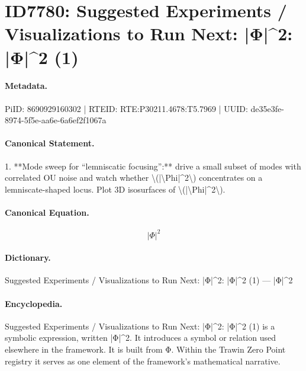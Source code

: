 \section*{ID7780: Suggested Experiments / Visualizations to Run Next: |Φ|\textasciicircum{}2: |Φ|\textasciicircum{}2 (1)}
\paragraph{Metadata.}
PiID: 8690929160302 | RTEID: RTE:P30211.4678:T5.7969 | UUID: de35e3fe-8974-5f5e-aa6e-6a6ef2f1067a

\paragraph{Canonical Statement.}
1. **Mode sweep for “lemniscatic focusing”:** drive a small subset of modes with correlated OU noise and watch whether \textbackslash{}(|\textbackslash{}Phi|\textasciicircum{}2\textbackslash{}) concentrates on a lemniscate-shaped locus. Plot 3D isosurfaces of \textbackslash{}(|\textbackslash{}Phi|\textasciicircum{}2\textbackslash{}).

\paragraph{Canonical Equation.}
\[
|\Phi|^2
\]

\paragraph{Dictionary.}
Suggested Experiments / Visualizations to Run Next: |Φ|\textasciicircum{}2: |Φ|\textasciicircum{}2 (1) — |Φ|\textasciicircum{}2

\paragraph{Encyclopedia.}
Suggested Experiments / Visualizations to Run Next: |Φ|\textasciicircum{}2: |Φ|\textasciicircum{}2 (1) is a symbolic expression, written |Φ|\textasciicircum{}2. It introduces a symbol or relation used elsewhere in the framework. It is built from Φ. Within the Trawin Zero Point registry it serves as one element of the framework's mathematical narrative.
